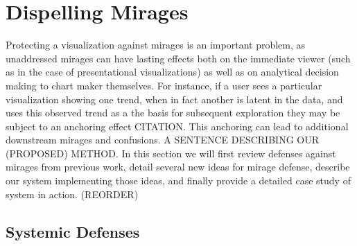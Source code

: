 
\section{Dispelling Mirages}

Protecting a visualization against mirages is an important problem, as unaddressed mirages can have lasting effects both on the immediate viewer (such as in the case of presentational visualizations) as well as on analytical decision making to chart maker themselves. For instance, if a user sees a particular visualization showing one trend, when in fact another is latent in the data, and uses this observed trend as a the basis for subsequent exploration they may be subject to an anchoring effect CITATION. This anchoring can lead to additional downstream mirages and confusions. A SENTENCE DESCRIBING OUR (PROPOSED) METHOD. In this section we will first review defenses against mirages from previous work, detail several new ideas for mirage defense, describe our system implementing those ideas, and finally provide a detailed case study of system in action. (REORDER)

\subsection{Systemic Defenses}

